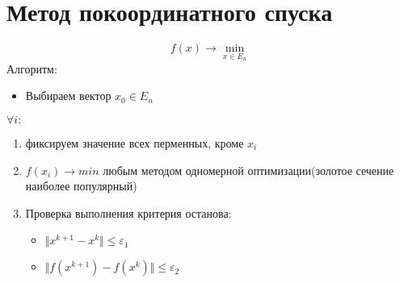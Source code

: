 \documentclass[oneside]{book}
\theoremstyle{plain}
\theoremstyle{remark}
\theoremstyle{definition}
\begin{document}
\section{Метод покоординатного спуска}
\label{sec:orga9bac65}
\[ f(x) \to \min_{x \in E_n} \]
Алгоритм:
\begin{itemize}
\item Выбираем вектор \(x_0 \in E_n\) \\
\end{itemize}
\(\forall i:\)
\begin{enumerate}
\item фиксируем значение всех перменных, кроме \(x_i\)
\item \(f(x_i) \to min\) любым методом одномерной оптимизации(золотое сечение наиболее популярный)
\item Проверка выполнения критерия останова:
\begin{itemize}
\item \(\Vert x^{k + 1} - x^{k} \Vert \le \varepsilon_1\)
\item \(\Vert f(x^{k + 1}) - f(x^k) \Vert \le \varepsilon_2\)
\end{itemize}
\end{enumerate}
\end{document}
